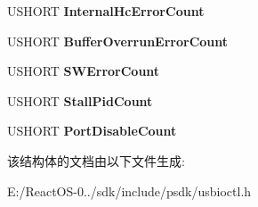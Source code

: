 \begin{DoxyCompactItemize}
U\+S\+H\+O\+RT {\bfseries Internal\+Hc\+Error\+Count}
\item 
\mbox{\label{struct___h_c_d___s_t_a_t___c_o_u_n_t_e_r_s_ae9fe57abe74dca029dde044cf774efda}} 
U\+S\+H\+O\+RT {\bfseries Buffer\+Overrun\+Error\+Count}
\item 
\mbox{\label{struct___h_c_d___s_t_a_t___c_o_u_n_t_e_r_s_a2a556cf4eb3f5070f1865421105a9bc8}} 
U\+S\+H\+O\+RT {\bfseries S\+W\+Error\+Count}
\item 
\mbox{\label{struct___h_c_d___s_t_a_t___c_o_u_n_t_e_r_s_ab02b598e055b963b69dca65f4876bff5}} 
U\+S\+H\+O\+RT {\bfseries Stall\+Pid\+Count}
\item 
\mbox{\label{struct___h_c_d___s_t_a_t___c_o_u_n_t_e_r_s_a4bcd5760a133f4f08a1d46848d432bc0}} 
U\+S\+H\+O\+RT {\bfseries Port\+Disable\+Count}
\end{DoxyCompactItemize}


该结构体的文档由以下文件生成\+:\begin{DoxyCompactItemize}
\item 
E\+:/\+React\+O\+S-\/0../sdk/include/psdk/usbioctl.\+h\end{DoxyCompactItemize}

